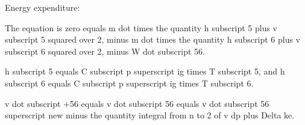 Energy expenditure:

The equation is zero equals m dot times the quantity h subscript 5 plus v subscript 5 squared over 2, minus m dot times the quantity h subscript 6 plus v subscript 6 squared over 2, minus W dot subscript 56.

h subscript 5 equals C subscript p superscript ig times T subscript 5, and h subscript 6 equals C subscript p superscript ig times T subscript 6.

v dot subscript +56 equals v dot subscript 56 equals v dot subscript 56 superscript new minus the quantity integral from n to 2 of v dp plus Delta ke.